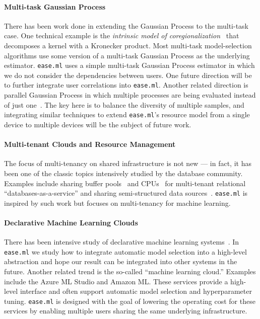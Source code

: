 \documentclass[letterpaper]{vldb}
\newcommand{\eml}{\texttt{ease.ml}\xspace}
\begin{document}
\vspace{-1em}
\paragraph*{Multi-task Gaussian Process}
There has been work done in extending the Gaussian Process to the 
multi-task case. One technical example is the {\em intrinsic model
of coregionalization}~\cite{Goovaerts1997} that decomposes
a kernel with a Kronecker product. Most 
multi-task model-selection algorithms use some version of
a multi-task Gaussian Process as the underlying estimator.
\eml uses a simple multi-task Gaussian Process estimator in which we
do not consider the dependencies between users. One 
future direction will be to further integrate user correlations 
into \eml. %
Another related direction is parallel Gaussian Process in which multiple
processes are being evaluated instead of just one~\cite{Desautels2014}.
The key here is to balance the diversity of multiple samples, 
and integrating similar techniques
to extend \eml's resource model from a single device to multiple devices will be the subject of future work.

\vspace{-1em}
\paragraph*{Multi-tenant Clouds and Resource Management}
The focus of multi-tenancy on shared infrastructure is not new ---
in fact, it has been one of the classic topics intensively
studied by the database community. Examples include
sharing buffer pools~\cite{Narasayya2015} and CPUs~\cite{Das2013}
for multi-tenant relational ``databases-as-a-service''
and sharing semi-structured data sources~\cite{Bellare2013}.
\eml is inspired by such work but focuses on
multi-tenancy for machine learning.

\vspace{-1em}
\paragraph*{Declarative Machine Learning Clouds} 
There has been intensive study of declarative
machine learning systems~\cite{Abadi2016,Alexandrov2015,Boehm2016a,Hellerstein:2012:VLDB,Low2012,Meng2001,Sparks2017}. In \eml we 
study how to integrate automatic model selection into
a high-level abstraction and hope our result can be integrated
into other systems in the future.
Another related trend is the so-called ``machine learning
cloud.'' Examples include the Azure ML Studio
and Amazon ML. These services
provide a high-level interface and often support automatic model selection
and hyperparameter tuning. \eml is designed with the goal of
lowering the operating cost for these services 
by enabling multiple users sharing the same underlying 
infrastructure.
\end{document}
